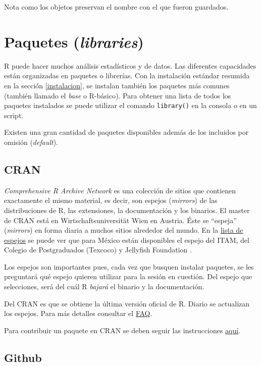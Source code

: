 \documentclass[]{article}
\begin{document}
Nota como los objetos preservan el nombre con el que fueron guardados.

\section{\texorpdfstring{Paquetes
(\emph{libraries})}{Paquetes (libraries)}}\label{paquetes-libraries}

R puede hacer muchos análisis estadísticos y de datos. Las diferentes
capacidades están organizadas en paquetes o librerías. Con la
instalación estándar resumida en la sección \ref{instalacion}, se
instalan también los paquetes más comunes (también llamado el
\emph{base} o R-básico). Para obtener una lista de todos los paquetes
instalados se puede utilizar el comando \texttt{library()} en la consola
o en un script.

Existen una gran cantidad de paquetes disponibles además de los
incluidos por omisión (\emph{default}).

\subsection{CRAN}\label{cran}

\emph{Comprehensive R Archive Network} \parencite{cran} es una colección
de sitios que contienen exactamente el mismo material, es decir, son
espejos (\emph{mirrors}) de las distribuciones de R, las extensiones, la
documentación y los binarios. El master de CRAN está en
Wirtschaftsuniversität Wien en Austria. Éste se ``espeja''
(\emph{mirrors}) en forma diaria a muchos sitios alrededor del mundo. En
la \href{https://cran.r-project.org/mirrors.html}{lista de espejos} se
puede ver que para México están disponibles el espejo del ITAM, del
Colegio de Postgraduados (Texcoco) y Jellyfish Foundation
\parencite{cran}.

Los espejos son importantes pues, cada vez que busquen instalar
paquetes, se les preguntará qué espejo quieren utilizar para la sesión
en cuestión. Del espejo que selecciones, será del cuál R \emph{bajará}
el binario y la documentación.

Del CRAN es que se obtiene la última versión oficial de R. Diario se
actualizan los espejos. Para más detalles consultar el
\href{https://cran.r-project.org/doc/FAQ/R-FAQ.html}{FAQ}.

Para contribuir un paquete en CRAN se deben seguir las instrucciones
\href{https://cran.r-project.org/web/packages/policies.html}{aquí}.

\subsection{Github}\label{github}
\end{document}

